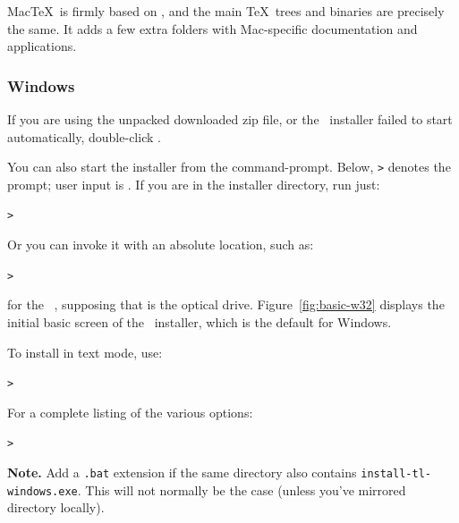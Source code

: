 \documentclass{article}
\begin{document}
Mac\TeX\ is firmly based on \TL, and the main \TeX\ trees and binaries
are precisely the same.  It adds a few extra folders with Mac-specific
documentation and applications.


\subsubsection{Windows}\label{sec:wininst}

If you are using the unpacked downloaded zip file, or the \DVD\
installer failed to start automatically, double-click
.

You can also start the installer from the command-prompt.  Below,
\texttt{>} denotes the prompt; user input is \Ucom{\texttt{bold}}.  If
you are in the installer directory, run just:
\begin{alltt}
> 
\end{alltt}

Or you can invoke it with an absolute location, such as:
\begin{alltt}
> 
\end{alltt}
for the \TK\ \DVD, supposing that  is the optical
drive. Figure~\ref{fig:basic-w32} displays the initial basic screen
of the \GUI\ installer, which is the default for Windows.

To install in text mode, use:
\begin{alltt}
> 
\end{alltt}

For a complete listing of the various options:
\begin{alltt}
> 
\end{alltt}

\textbf{Note.} Add a \texttt{.bat} extension if the same directory
also contains \texttt{install-tl-windows.exe}. This will not
normally be the case (unless you've mirrored  directory
locally).
\end{document}
